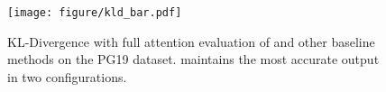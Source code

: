 \begin{figure}[t]
    \centering
    \texttt{[image: figure/kld\_bar.pdf]} 
    \caption{KL-Divergence with full attention evaluation of \sys and other baseline methods on the PG19 dataset. \sys maintains the most accurate output in two configurations.}
    \label{fig:kld}
    \vspace{-0.1in}
\end{figure}
